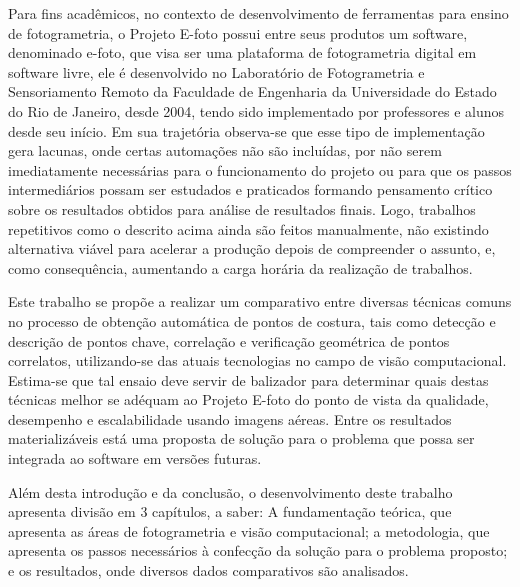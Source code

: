 Para fins acadêmicos, no contexto de desenvolvimento de ferramentas para ensino de fotogrametria, o Projeto E-foto possui entre seus produtos um software, denominado e-foto, que visa ser uma plataforma de fotogrametria digital em software livre, ele é desenvolvido no Laboratório de Fotogrametria e Sensoriamento Remoto da Faculdade de Engenharia da Universidade do Estado do Rio de Janeiro, desde 2004, tendo sido implementado por professores e alunos desde seu início. Em sua trajetória observa-se que esse tipo de implementação gera lacunas, onde certas automações não são incluídas, por não serem imediatamente necessárias para o funcionamento do projeto ou para que os passos intermediários possam ser estudados e praticados formando pensamento crítico sobre os resultados obtidos para análise de resultados finais. Logo, trabalhos repetitivos como o descrito acima ainda são feitos manualmente, não existindo alternativa viável para acelerar a produção depois de compreender o assunto, e, como consequência, aumentando a carga horária da realização de trabalhos.

Este trabalho se propõe a realizar um comparativo entre diversas técnicas comuns no processo de obtenção automática de pontos de costura, tais como detecção e descrição de pontos chave, correlação e verificação geométrica de pontos correlatos, utilizando-se das atuais tecnologias no campo de visão computacional. Estima-se que tal ensaio deve servir de balizador para determinar quais destas técnicas melhor se adéquam ao Projeto E-foto do ponto de vista da qualidade, desempenho e escalabilidade usando imagens aéreas. Entre os resultados materializáveis está uma proposta de solução para o problema que possa ser integrada ao software em versões futuras.

Além desta introdução e da conclusão, o desenvolvimento deste trabalho apresenta divisão em 3 capítulos, a saber: A fundamentação teórica, que apresenta as áreas de fotogrametria e visão computacional; a metodologia, que apresenta os passos necessários à confecção da solução para o problema proposto; e os resultados, onde diversos dados comparativos são analisados.
